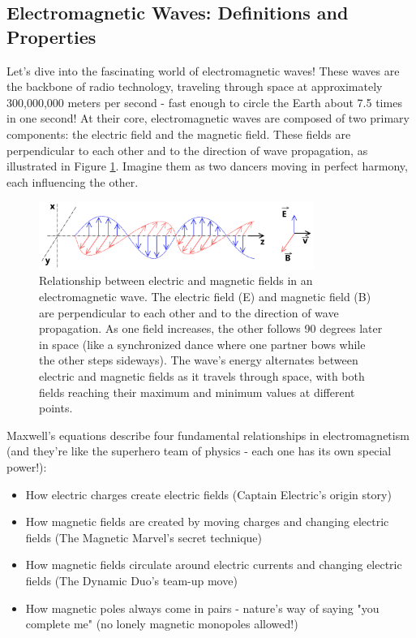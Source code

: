 \subsection{Electromagnetic Waves: Definitions and Properties}
\label{subsec:ac-basics2}

Let's dive into the fascinating world of electromagnetic waves! These waves are the backbone of radio technology, traveling through space at approximately 300,000,000 meters per second - fast enough to circle the Earth about 7.5 times in one second! At their core, electromagnetic waves are composed of two primary components: the electric field and the magnetic field. These fields are perpendicular to each other and to the direction of wave propagation, as illustrated in Figure \ref{fig:em-wave}. Imagine them as two dancers moving in perfect harmony, each influencing the other.

\begin{figure}[h]
    \centering
    \includegraphics[width=0.8\textwidth]{images/em-wave.png}
    \caption{Relationship between electric and magnetic fields in an electromagnetic wave. The electric field (E) and magnetic field (B) are perpendicular to each other and to the direction of wave propagation. As one field increases, the other follows 90 degrees later in space (like a synchronized dance where one partner bows while the other steps sideways). The wave's energy alternates between electric and magnetic fields as it travels through space, with both fields reaching their maximum and minimum values at different points.}
    \label{fig:em-wave}
\end{figure}

Maxwell's equations describe four fundamental relationships in electromagnetism (and they're like the superhero team of physics - each one has its own special power!):
\begin{itemize}[noitemsep]
    \item How electric charges create electric fields (Captain Electric's origin story)
    \item How magnetic fields are created by moving charges and changing electric fields (The Magnetic Marvel's secret technique)
    \item How magnetic fields circulate around electric currents and changing electric fields (The Dynamic Duo's team-up move)
    \item How magnetic poles always come in pairs - nature's way of saying "you complete me" (no lonely magnetic monopoles allowed!)
\end{itemize}

